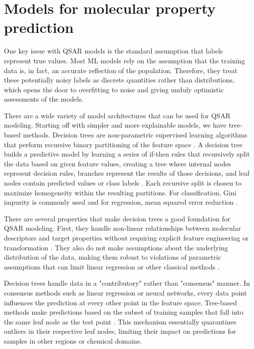 \section{Models for molecular property prediction}

One key issue with QSAR models is the standard assumption that labels represent true values. Most ML models rely on the assumption that the training data is, in fact, an accurate reflection of the population. Therefore, they treat these potentially noisy labels as discrete quantities rather than distributions, which opens the door to overfitting to noise and giving unduly optimistic assessments of the models.

There are a wide variety of model architectures that can be used for QSAR modeling. Starting off with simpler and more explainable models, we have tree-based methods. Decision trees are non-parametric supervised learning algorithms that perform recursive binary partitioning of the feature space \citep{Breiman1984}. A decision tree builds a predictive model by learning a series of if-then rules that recursively split the data based on given feature values, creating a tree  where internal nodes represent decision rules, branches represent the results of those decisions, and leaf nodes contain predicted values or class labels \citep{Breiman1984}. Each recursive split is chosen to maximize  homogeneity within the resulting partitions. For classification, Gini impurity is commonly used and for regression, mean squared error reduction \citep{Breiman1984}.

There are several properties that make decision trees a good foundation for QSAR modeling. First, they handle non-linear relationships between molecular descriptors and target properties without requiring explicit feature engineering or transformation \citep{Breiman1984}. They also do not make assumptions about the underlying distribution of the data, making them robust to violations of parametric assumptions that can limit linear regression or other classical methods \citep{Svetnik2003}. 

Decision trees handle data in a "contributory" rather than "consensus" manner. In consensus methods such as linear regression or neural networks, every data point influences the prediction at every other point in the feature space. Tree-based methods make predictions based on the subset of training samples that fall into the same leaf node as the test point \citep{Breiman1984}. This mechanism essentially quarantines outliers in their respective leaf nodes, limiting their impact on predictions for samples in other regions or chemical domains. 

